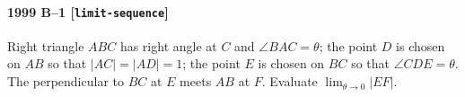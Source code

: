 \paragraph{1999 B--1 \textnormal{[\texttt{limit-sequence}]}}
Right triangle $ABC$ has right angle at $C$ and $\angle BAC =\theta$;
the point $D$ is chosen on $AB$ so that $|AC|=|AD|=1$; the point $E$
is chosen on $BC$ so that $\angle CDE = \theta$. The perpendicular
to $BC$ at $E$ meets $AB$ at $F$. Evaluate $\lim_{\theta\rightarrow 0}
|EF|$.
